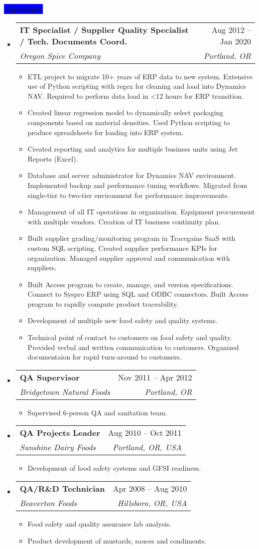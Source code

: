 \documentclass[letterpaper,12pt]{article}[leftmargin=*]
\makeatletter
\def \entryspacing {-0pt}
\newcommand{\experience}[2]{\vspace{6pt}
  \colorbox{Blue}{\color{white}\raggedbottom\normalsize\textbf{{#1}{\hspace{9pt}#2\hspace{4pt}}}}
}
\newcommand{\resumeEntryStart}{\begin{itemize}[leftmargin=2.5mm]}
\newcommand{\resumeEntryEnd}{\end{itemize}\vspace{\entryspacing}}
\newcommand{\resumeItemListStart}{\begin{itemize}[leftmargin=4.5mm]}
\newcommand{\resumeItemListEnd}{\end{itemize}}
\newcommand{\resumeItem}[1]{
  \item\small{
    {#1 \vspace{-2pt}}
  }
}
\newcommand{\resumeEntryTSDL}[4]{
  \vspace{-1pt}\item[]
    \begin{tabularx}{0.97\textwidth}{X@{\hspace{60pt}}r}
      \textbf{\color{primary}#1} & {\firabook\color{accent}\small#2} \\
      \textit{\color{accent}\small#3} & \textit{\color{accent}\small#4} \\
    \end{tabularx}\vspace{-6pt}
}
\makeatother
\begin{document}
\experience{\faPieChart}{Experience}
\resumeEntryStart
\resumeEntryTSDL
{IT Specialist / Supplier Quality Specialist / Tech. Documents Coord.}{Aug 2012 -- Jan 2020}
{Oregon Spice Company}{Portland, OR}
\resumeItemListStart
\resumeItem {ETL project to migrate 10+ years of ERP data to new system. Extensive use of Python scripting with regex for cleaning and load into Dynamics NAV. Required to perform data load in <12 hours for ERP transition.
}
\resumeItem {Created linear regression model to dynamically select packaging components based on material densities. Used Python scripting to produce spreadsheets for loading into ERP system.}
\resumeItem {Created reporting and analytics for multiple business units using Jet Reports (Excel).}
\resumeItem {Database and server administrator for Dynamics NAV environment. Implemented backup and performance tuning workflows. Migrated from single-tier to two-tier environment for performance improvements.}
\resumeItem {Management of all IT operations in organization. Equipment procurement with multiple vendors. Creation of IT business continuity plan.}
\resumeItem {Built supplier grading/monitoring program in Tracegains SaaS with custom SQL scripting. Created supplier performance KPIs for organization. Managed supplier approval and communication with suppliers.}
\resumeItem {Built Access program to create, manage, and version specifications. Connect to Syspro ERP using SQL and ODBC connectors. Built Access program to rapidly compute product traceability.}
\resumeItem {Development of multiple new food safety and quality systems.}
\resumeItem {Technical point of contact to customers on food safety and quality. Provided verbal and written communication to customers. Organized documentaion for rapid turn-around to customers.}
\resumeItemListEnd
\resumeEntryEnd

\resumeEntryStart
\resumeEntryTSDL
{QA Supervisor}{Nov 2011 -- Apr 2012}
{Bridgetown Natural Foods}{Portland, OR}
\resumeItemListStart
\resumeItem {Supervised 6-person QA and sanitation team.}
\resumeItemListEnd
\resumeEntryEnd

\pagebreak

\resumeEntryStart
\resumeEntryTSDL
{QA Projects Leader}{Aug 2010 -- Oct 2011}
{Sunshine Dairy Foods}{Portland, OR, USA}
\resumeItemListStart
\resumeItem {Development of food safety systems and GFSI readiness.}
\resumeItemListEnd
\resumeEntryEnd

\resumeEntryStart
\resumeEntryTSDL
{QA/R\&D Technician}{Apr 2008 -- Aug 2010}
{Beaverton Foods}{Hillsboro, OR, USA}
\resumeItemListStart
\resumeItem {Food safety and quality assurance lab analysis.}
\resumeItem {Product development of mustards, sauces and condiments.}
\resumeItemListEnd
\resumeEntryEnd
\end{document}
